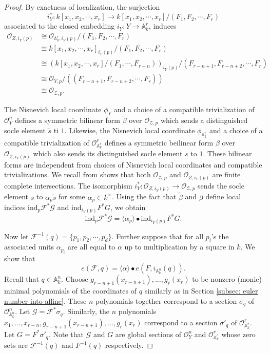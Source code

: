 \documentclass[12pt, reqno]{amsart}
\theoremstyle{definition}
\newcommand{\A}{\mathbb{A}} %
\newcommand{\Oh}{\mathscr{O}} %
\newcommand{\ind}{\mathrm{ind}} %
\begin{document}
\begin{proof}
By exactness of localization, the surjection 
$$i_Y^*: k[x_1, x_2, \cdots, x_r] \to k[x_1, x_2, \cdots, x_r] / (F_1, F_2, \cdots, F_r)$$ 
associated to the closed embedding $i_Y:Y \to \A^r_k$, induces
\begin{align*}
    \Oh_{Z,i_Y(p)} & \cong \Oh_{\A^r_k, i_Y(p)} / (F_1, F_2, \cdots, F_r) \\
    & \cong k[x_1, x_2, \cdots, x_r]_{i_Y(p)} / (F_1, F_2, \cdots, F_r) \\
    & \cong \left( k[x_1, x_2, \cdots, x_r]/(F_1, \cdots, F_{r-n}) \right)_{i_Y(p)} / (F_{r-n+1}, F_{r-n+2}, \cdots, F_r) \\
    & \cong \Oh_{Y, p} / \left( (F_{r-n+1}, F_{r-n+2}, \cdots, F_r) \right) \\
    & \cong \Oh_{\mathcal{Z}, p}.
\end{align*}

The Nisnevich local coordinate $\phi_Y$ and a choice of a compatible trivialization of $\Oh^n_Y$ defines a symmetric bilinear form $\tilde{\beta}$ over $\Oh_{\mathcal{Z}, p}$ which sends a distinguished socle element $\tilde{s}$ ti $1$. Likewise, the Nisnevich local coordinate $\phi_{\A^r_k}$ and a choice of a compatible trivialization of $\Oh^r_{\A^r_k}$ defines a symmetric beilinear form $\beta$ over $\Oh_{Z,i_Y(p)}$ which also sends its distinguished socle element $s$ to $1$. These bilinear forms are independent from choices of Nisnevich local coordinates and compatible trivializations. We recall from  \cite[Lemma 27]{kwcubic} shows that both $\Oh_{\mathcal{Z}, p}$ and $\Oh_{Z,i_Y(p)}$ are finite complete intersections. The isomorphism $i_Y^*: \Oh_{Z,i_Y(p)} \to \Oh_{\mathcal{Z}, p}$ sends the socle element $s$ to $\alpha_p \tilde{s}$ for some $\alpha_p \in k^\times$. Using the fact that $\tilde{\beta}$ and $\beta$ define local indices $\ind_p \mathcal{F}^* \mathcal{G}$ and $\ind_{i_Y(p)} F^* G$, we obtain
\begin{equation*}
    \ind_{p} \mathcal{F}^* \mathcal{G} = \langle \alpha_{p} \rangle \bullet \ind_{i_{Y}(p)} F^* G.
\end{equation*}

Now let $\mathcal{F}^{-1}(q) = \{p_1, p_2, \cdots, p_d\}$. Further suppose that for all $p_i$'s the associated units $\alpha_{p_i}$ are all equal to $\alpha$ up to multiplication by a square in $k$. We show that
$$e(\mathcal{F},q) = \langle \alpha \rangle \bullet e(F, i_{\A^n_k}(q)).$$
Recall that $q \in  \A^n_k$. Choose $g_{r-n+1}(x_{r-n+1}),\ldots,g_r(x_r)$ to be nonzero (monic) minimal polynomials of the coordinates of $q$ similarly as in Section \ref{subsec: euler number into affine}. These $n$ polynomials together correspond to a section $\sigma_q$ of $\Oh^n_{\A^n_k}$. Let $\mathcal{G} = \mathcal{F}^* \sigma_q$. Similarly, the $n$ polynomials $x_1,\ldots,x_{r-n},g_{r-n+1}(x_{r-n+1}),\ldots,g_r(x_r)$ correspond to a section $\sigma'_q$ of $\Oh^r_{\A^r_k}$. Let $G = F^* \sigma'_q$. Note that $\mathcal{G}$ and $G$ are global sections of $\Oh_Y^n$ and $\Oh^r_{\A^r_k}$ whose zero sets are $\mathcal{F}^{-1}(q)$ and $F^{-1}(q)$ respectively.


\end{proof}
\end{document}
